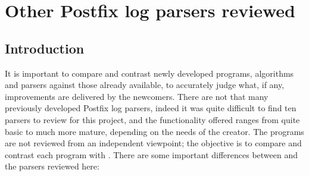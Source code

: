 \section{Other Postfix log parsers reviewed}

\label{other-parsers}

\subsection{Introduction}

It is important to compare and contrast newly developed programs,
algorithms and parsers against those already available, to accurately judge
what, if any, improvements are delivered by the newcomers.  There are not
that many previously developed Postfix log parsers, indeed it was quite
difficult to find ten parsers to review for this project, and the
functionality offered ranges from quite basic to much more mature,
depending on the needs of the creator.  The programs are not reviewed from
an independent viewpoint; the objective is to compare and contrast each
program with \parsername{}.  There are some important differences between
\parsername{} and the parsers reviewed here:

